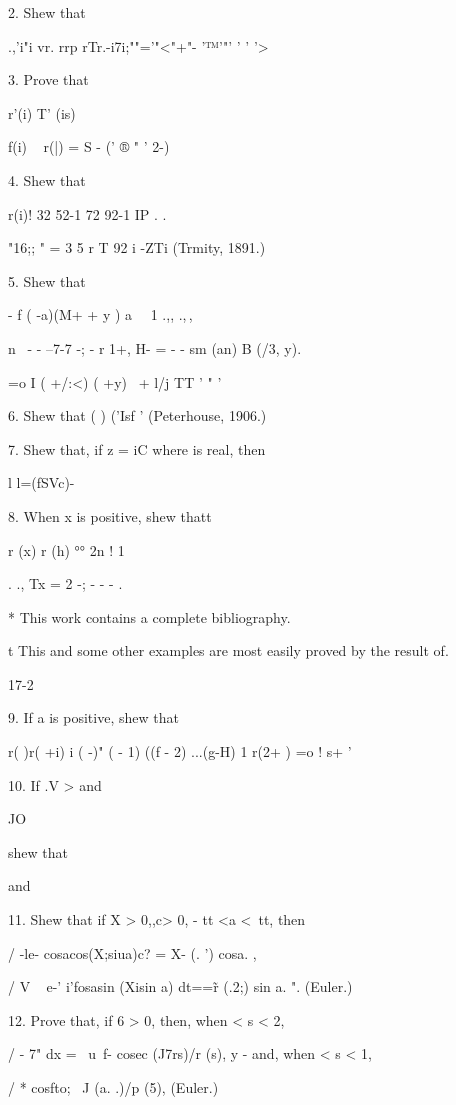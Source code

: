 2. Shew that

.,'i"i vr. rrp rTr.-i7i;""='"<"+"- '™'"' ' ' '>

3. Prove that

r'(i) T' (is)

f(i) ~ r(|) = S - (' ® " ' 2-)

4. Shew that

 r(i)! 32 52-1 72 92-1 IP . .

"16;; " = 3  5  r T  92  i -ZTi  (Trmity, 1891.)

5. Shew that

- f ( -a)(M+ + y ) a \ \ 1 .,, .,\,,

n \ - - --7-7 -; - r 1+, H- = - - sm (an) B (/3, y).

 =o I ( +/:<) ( +y) \ + l/j TT ' " '


6. Shew that ( ) ('Isf ' (Peterhouse, 1906.)

7. Shew that, if z = iC where is real, then

l l=\/(fSVc)- 

8. When x is positive, shew thatt

r (x) r (h) °° 2n ! 1

 . ., Tx = 2 -; - - - . 

* This work contains a complete bibliography.

t This and some other examples are most easily proved by the result of.

17-2

%
%

9. If a is positive, shew that

r( )r( +i) i ( -)" ( - 1) ((f - 2) ...(g-H) 1 r(2+ ) =o ! s+ '

10. If .V > and

JO

shew that

and

11. Shew that if X > 0,,c> 0, - tt <a <\ tt, then

/ -le- cosacos(X;siua)c? = X- (. ') cosa. ,

/ V ~ e-' i'fosasin (Xisin a) dt==\~ r (.2;) sin a. ". (Euler.)

12. Prove that, if 6 > 0, then, when < s < 2,

/ - 7" dx = \ u\ f- cosec (J7rs)/r (s), y - and, when < s < 1,

/ * cosfto; \ J (a. .)/p (5), (Euler.)

